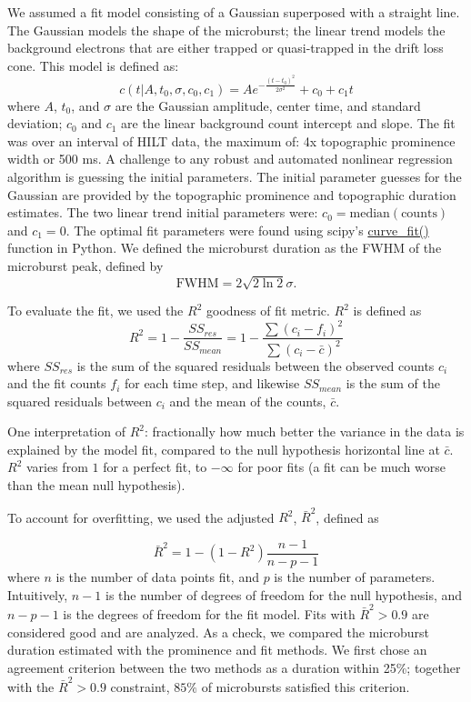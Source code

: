 \documentclass[draft]{agujournal2019}
\begin{document}
We assumed a fit model consisting of a Gaussian superposed with a straight line. The Gaussian models the shape of the microburst; the linear trend models the background electrons that are either trapped or quasi-trapped in the drift loss cone. This model is defined as:
\begin{equation}
c(t | A, t_0, \sigma, c_0, c_1) = A e^{-\frac{(t-t_0)^2}{2\sigma^2}} + c_0 + c_1 t
\end{equation} where $A$, $t_0$, and $\sigma$ are the Gaussian amplitude, center time, and standard deviation; $c_0$ and $c_1$ are the linear background count intercept and slope. The fit was over an interval of HILT data, the maximum of: 4x topographic prominence width or 500 ms. A challenge to any robust and automated nonlinear regression algorithm is guessing the initial parameters. The initial parameter guesses for the Gaussian are provided by the topographic prominence and topographic duration estimates. The two linear trend initial parameters were: $c_0=\mathrm{median(counts)}$ and $c_1=0$. The optimal fit parameters were found using scipy's \url{curve_fit()} function in Python. We defined the microburst duration as the FWHM of the microburst peak, defined by
\begin{equation}
\mathrm{FWHM} = 2\sqrt{2 \ln{2}} \sigma.
\end{equation}

To evaluate the fit, we used the $R^2$ goodness of fit metric. $R^2$ is defined as
\begin{equation}
R^2 = 1 - \frac{SS_{res}}{SS_{mean}} = 1 - \frac{\sum{(c_i-f_i)^2}}{\sum{(c_i-\bar{c})^2}}
\end{equation} where $SS_{res}$ is the sum of the squared residuals between the observed counts $c_i$ and the fit counts $f_i$ for each time step, and likewise $SS_{mean}$ is the sum of the squared residuals between $c_i$ and the mean of the counts, $\bar{c}$.

One interpretation of $R^2$: fractionally how much better the variance in the data is explained by the model fit, compared to the null hypothesis horizontal line at $\bar{c}$. $R^2$ varies from $1$ for a perfect fit, to $-\infty$ for poor fits (a fit can be much worse than the mean null hypothesis).

To account for overfitting, we used the adjusted $R^2$, $\bar{R}^2$, defined as

\begin{equation}
\bar{R}^2 = 1 - (1-R^2) \frac{n-1}{n-p-1}
\end{equation} where $n$ is the number of data points fit, and $p$ is the number of parameters. Intuitively, $n-1$ is the number of degrees of freedom for the null hypothesis, and $n-p-1$ is the degrees of freedom for the fit model. Fits with $\bar{R}^2 > 0.9$ are considered good and are analyzed. As a check, we compared the microburst duration estimated with the prominence and fit methods. We first chose an agreement criterion between the two methods as a duration within 25\%; together with the $\bar{R}^2 > 0.9$ constraint, $85\%$ of microbursts satisfied this criterion.
\end{document}
